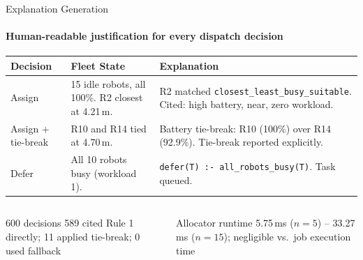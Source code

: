 \documentclass[aspectratio=169]{beamer}
\begin{document}
\begin{frame}[shrink=15]{Explanation Generation}
  \framesubtitle{Human-readable justification for every dispatch decision}
  \footnotesize
  \begin{table}
    \begin{tabularx}{\textwidth}{lXX}
      \textbf{Decision} & \textbf{Fleet State} & \textbf{Explanation} \\
      \toprule
      Assign &
        15 idle robots, all 100\%. R2 closest at 4.21\,m. &
        R2 matched \texttt{closest\_least\_busy\_suitable}.
        Cited: high battery, near, zero workload. \\
      \midrule
      Assign + tie-break &
        R10 and R14 tied at 4.70\,m. &
        Battery tie-break: R10 (100\%) over R14 (92.9\%).
        Tie-break reported explicitly. \\
      \midrule
      Defer &
        All 10 robots busy (workload 1). &
        \texttt{defer(T) :- all\_robots\_busy(T)}.
        Task queued. \\
      \bottomrule
    \end{tabularx}
  \end{table}
  \vspace{0.2em}
  \begin{columns}
      \begin{block}{600 decisions}
        589 cited Rule 1 directly; 11 applied tie-break; 0 used fallback
      \end{block}
      \begin{block}{Allocator runtime}
        5.75\,ms ($n=5$) -- 33.27\,ms ($n=15$); negligible vs.\ job execution time
      \end{block}
  \end{columns}
\end{frame}
\end{document}
